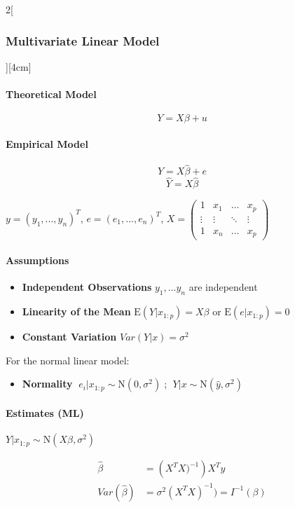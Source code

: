 \documentclass[8pt]{extarticle}
\begin{document}
\begin{multicols}{2}[\subsubsection{Multivariate Linear Model}][4cm]

\paragraph{Theoretical Model}

$$Y = X\beta + u$$

\paragraph{Empirical Model}

$$Y = X\hat{\beta} + e$$
$$\hat{Y} = X\hat{\beta} $$

\noindent $y = (y_1, ... , y_n)^T$, $e = (e_1, ... , e_n)^T$, $X = \begin{pmatrix}
1 & x_1& \ldots&x_p \\
 \vdots & \vdots&\ddots & \vdots\\
1 & x_n &\ldots&x_p
\end{pmatrix}$

\paragraph{Assumptions}

\begin{itemize}
\item \textbf{Independent Observations} $y_1,...y_n$ are independent
\item \textbf{Linearity of the Mean} $\mathrm{E}(Y|x_{1:p})= X\beta$ or $\mathrm{E}(e|x_{1:p})= 0$ 
\item \textbf{Constant Variation} $Var(Y|x) = \sigma^2$
\end{itemize}
For the normal linear model:
\begin{itemize}
\item \textbf{Normality} $\;e_i|x_{1:p} \sim \mathrm{N}(0,\sigma^2)\;$; $\;Y|x \sim \mathrm{N}(\hat{y},\sigma^2)\;$
\end{itemize}

\paragraph{Estimates (ML)} $Y|x_{1:p} \sim \mathrm{N}(X\beta, \sigma^2)$

\begin{align*}
\hat{\beta} &= \left(X^TX)^{-1}\right)X^Ty\\
Var(\hat{\beta}) &= \sigma^2(X^TX)^{-1}) = I^{-1}(\beta)
\end{align*}


\end{multicols}
\end{document}
